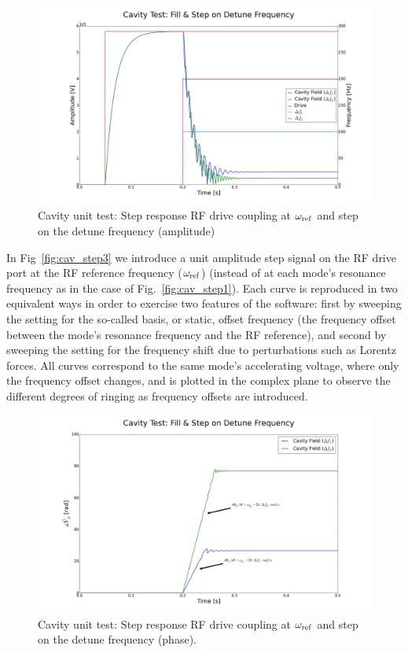 \documentclass[a4paper,12pt]{article}
\begin{document}
\begin{figure}
\centering
\includegraphics[scale=0.24]{../figures/cavity_test_detune.png}
\caption{Cavity unit test: Step response RF drive coupling at $\omega_{\rm ref}$ and step on the detune frequency (amplitude)}
\label{fig:cav_step4}
\end{figure}

In Fig~\ref{fig:cav_step3} we introduce a unit amplitude step signal on the RF drive port at the RF reference frequency ($\omega_{\rm ref}$) (instead of at each mode's resonance frequency as in the case of Fig.~\ref{fig:cav_step1}). Each curve is reproduced in two equivalent ways in order to exercise two features of the software: first by sweeping the setting for the so-called basis, or static, offset frequency (the frequency offset between the mode's resonance frequency and the RF reference), and second by sweeping the setting for the frequency shift due to perturbations such as Lorentz forces. All curves correspond to the same mode's accelerating voltage, where only the frequency offset changes, and is plotted in the complex plane to observe the different degrees of ringing as frequency offsets are introduced.

\begin{figure}
\centering
\includegraphics[scale=0.26]{../figures/cavity_test_detune_phase.png}
\caption{Cavity unit test: Step response RF drive coupling at $\omega_{\rm ref}$ and step on the detune frequency (phase).}
\label{fig:cav_step5}
\end{figure}
\end{document}
